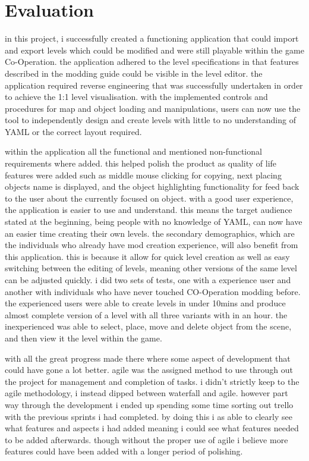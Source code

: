 
\section{Evaluation}

in this project, i successfully created a functioning application that could import and export levels which could be modified and were still playable within the game Co-Operation. the application adhered to the level specifications in that features described in the modding guide could be visible in the level editor. the application required reverse engineering that was successfully undertaken in order to achieve the 1:1 level visualisation. with the implemented controls and procedures for map and object loading and manipulations, users can now use the tool to independently design and create levels with little to no understanding of YAML or the correct layout required. 

within the application all the functional and mentioned non-functional requirements where added. this helped polish the product as quality of life features were added such as middle mouse clicking for copying, next placing objects name is displayed, and the object highlighting functionality for feed back to the user about the currently focused on object. with a good user experience, the application is easier to use and understand. this means the target audience stated at the beginning, being people with no knowledge of YAML, can now have an easier time creating their own levels. the secondary demographics, which are the individuals who already have mod creation experience, will also benefit from this application. this is because it allow for quick level creation as well as easy switching between the editing of levels, meaning other versions of the same level can be adjusted quickly. i did two sets of tests, one with a experience user and another with individuals who have never touched CO-Operation modding before. the experienced users were able to create levels in under 10mins and produce almost complete version of a level with all three variants with in an hour. the inexperienced was able to select, place, move and delete object from the scene, and then view it the level within the game.

with all the great progress made there where some aspect of development that could have gone a lot better. agile was the assigned method to use through out the project for management and completion of tasks. i didn't strictly keep to the agile methodology, i instead dipped between waterfall and agile. however part way through the development i ended up spending some time sorting out trello with the previous sprints i had completed. by doing this i as able to clearly see what features and aspects i had added meaning i could see what features needed to be added afterwards. though without the proper use of agile i believe more features could have been added with a longer period of polishing.

